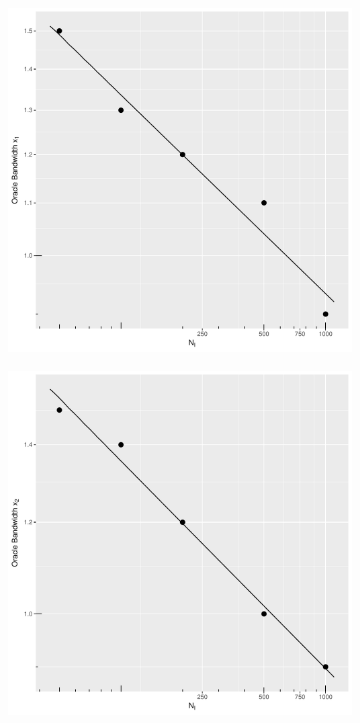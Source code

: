 \begin{figure}[htbp]
    \centering
    \begin{subfigure}[t]{0.195\textwidth}
        \centering
        \includegraphics[width=\textwidth]{results/by_h_per_mu/oracle_bandwidth_x1_vs_mu.pdf}
    \end{subfigure}
    \begin{subfigure}[t]{0.195\textwidth}
        \centering
        \includegraphics[width=\textwidth]{results/by_h_per_mu/oracle_bandwidth_x2_vs_mu.pdf}

\end{subfigure}
\end{figure}
